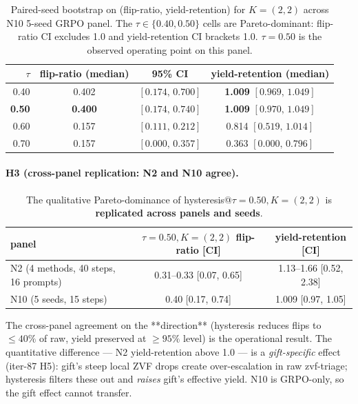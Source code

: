 \begin{table}[ht]
\centering
\small
\begin{tabular}{rccc}
\toprule
$\tau$ & flip-ratio (median) & 95\% CI & yield-retention (median) \\
\midrule
0.40 & 0.402 & $[0.174,\, 0.700]$ & \textbf{1.009} $[0.969,\, 1.049]$ \\
\textbf{0.50} & \textbf{0.400} & $\mathbf{[0.174,\, 0.740]}$ & \textbf{1.009} $[0.970,\, 1.049]$ \\
0.60 & 0.157 & $[0.111,\, 0.212]$ & 0.814 $[0.519,\, 1.014]$ \\
0.70 & 0.157 & $[0.000,\, 0.357]$ & 0.363 $[0.000,\, 0.796]$ \\
\bottomrule
\end{tabular}
\caption{Paired-seed bootstrap on (flip-ratio, yield-retention) for
$K=(2,2)$ across N10 5-seed GRPO panel. The $\tau \in \{0.40, 0.50\}$
cells are Pareto-dominant: flip-ratio CI excludes 1.0 and yield-retention
CI brackets 1.0. $\tau = 0.50$ is the observed operating point on this panel.}
\label{tab:p7-hyst-n10}
\end{table}

\paragraph{H3 (cross-panel replication: N2 and N10 agree).}

\begin{table}[ht]
\centering
\small
\begin{tabular}{lcc}
\toprule
panel & $\tau=0.50, K=(2,2)$ flip-ratio [CI] & yield-retention [CI] \\
\midrule
N2 (4 methods, 40 steps, 16 prompts) & 0.31--0.33 [0.07, 0.65] & 1.13--1.66 [0.52, 2.38] \\
N10 (5 seeds, 15 steps)             & 0.40 [0.17, 0.74]      & 1.009 [0.97, 1.05] \\
\bottomrule
\end{tabular}
\caption{The qualitative Pareto-dominance of hysteresis@$\tau{=}0.50,
K{=}(2,2)$ is \textbf{replicated across panels and seeds}.}
\label{tab:p7-hyst-cross-panel}
\end{table}

The cross-panel agreement on the **direction** (hysteresis reduces flips
to $\le 40\%$ of raw, yield preserved at $\ge 95\%$ level) is the
operational result. The quantitative difference --- N2 yield-retention
above 1.0 --- is a \emph{gift-specific} effect (iter-87 H5): gift's steep
local ZVF drops create over-escalation in raw zvf-triage; hysteresis
filters these out and \emph{raises} gift's effective yield. N10 is
GRPO-only, so the gift effect cannot transfer.

